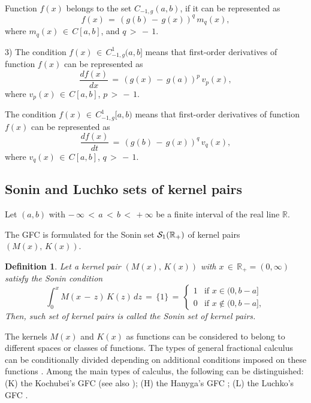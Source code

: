 \documentclass[12pt]{article}
\newtheorem{Definition}{Definition}
\begin{document}
Function $f(x)$ belongs to the set $C_{-1,g}(a,b)$, if it
can be represented as
\[
f(x) \, = \, (g(b) \, - \, g(x))^{q} \, m_q(x) ,
\]
where $m_q(x) \, \in \, C[a,b]$, and $q \, > \, - \, 1$.

3) The condition $f(x) \, \in \, C^1_{-1,g}(a,b]$ means that first-order derivatives of function $f(x)$ can be represented as
\[
\frac{d f(x)}{d x} 
\, = \, (g(x) \, - \, g(a))^{p} \, v_p(x) ,
\]
where $v_p(x) \, \in \, C[a,b]$, $p \, > \, - \, 1$. 

The condition $f(x) \, \in \, C^1_{-1,g}[a,b)$
means that first-order derivatives of function $f(x)$ can be represented as
\[
\frac{d f(x)}{d t} 
\, = \, (g(b) \, - \, g(x))^{q} \, v_q(x) ,
\]
where $v_q (x) \, \in \, C[a,b]$, $q \, > \, - \, 1$.



\subsection{Sonin and Luchko sets of kernel pairs}


Let $(a,b)$ with 
$ - \, \infty \, < \, a \, < \, b \, < \, +\infty$ be a finite interval of the real line $\mathbb{R}$. 

The GFC is formulated for the Sonin set ${\cal S}_{1}(\mathbb{R}_{+})$ of kernel pairs $( M(x) , \, K(x))$.

\begin{Definition}
Let a kernel pair $( M(x) , \, K(x))$ with 
$x \, \in \, \mathbb{R}_{+} = (0,\infty)$ 
satisfy the Sonin condition
\begin{equation} \label{S-C}
\int^{x}_{0} M (x \, - \, z) \, 
 K (z) \, dz \, = \, \{1\} \, = \, 
\begin{cases}
1 & \mbox{if } x \in (0,b-a] \\
0 & \mbox{if } x \notin (0,b-a] ,
\end{cases}
\end{equation}
Then, such set of kernel pairs is called the Sonin set of kernel pairs.
\end{Definition}

The kernels $M(x)$ and $K(x)$ as functions can be considered to belong to different spaces or classes of functions. 
The types of general fractional calculus can be conditionally divided depending on additional conditions imposed on these functions \cite{Luchko2021-1}. 
Among the main types of calculus, the following can be distinguished: 
({\cal K}) the Kochubei's GFC \cite{Kochubei2011} (see also \cite{Kochubei2019-1,Kochubei2019-2});
({\cal H}) the Hanyga's GFC \cite{Hanyga};
({\cal L}) the Luchko's GFC \cite{Luchko2021-1}.
\end{document}
